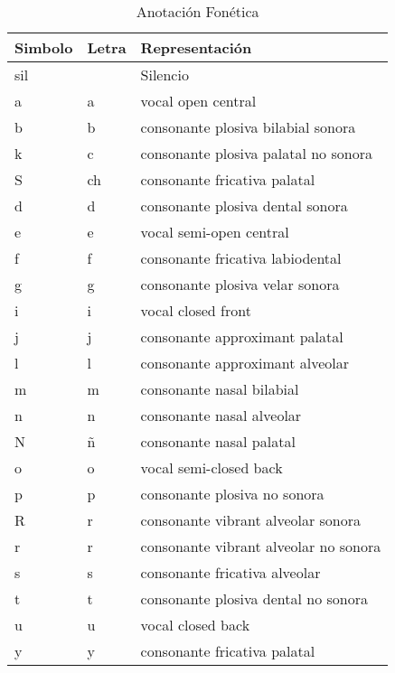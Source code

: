\begin{table}[H]
\centering
\caption{Anotación Fonética}
\label{tab:anotacion_fonetica}
\begin{tabular}{|l|l|l|}
\textbf{Simbolo} & \textbf{Letra} & \textbf{Representación} \\ \hline
sil              & & Silencio                               \\ \hline
a                & a & vocal open central                   \\ \hline
b                & b &  consonante plosiva bilabial sonora   \\ \hline 
k                & c &  consonante plosiva palatal no sonora \\ \hline 
S                & ch &  consonante fricativa palatal        \\ \hline 
d                & d &  consonante plosiva dental sonora     \\ \hline 
e                & e &  vocal semi-open central              \\ \hline
f                & f &  consonante fricativa labiodental     \\ \hline 
g                & g &  consonante plosiva velar sonora      \\ \hline
i                & i &  vocal closed front                   \\ \hline
j                & j &  consonante approximant palatal       \\ \hline
l                & l &  consonante approximant alveolar      \\ \hline 
m                & m &  consonante nasal bilabial            \\ \hline 
n                & n &  consonante nasal alveolar            \\ \hline 
N                & ñ &  consonante nasal palatal             \\ \hline 
o                & o &  vocal semi-closed back               \\ \hline
p                & p &  consonante plosiva no sonora         \\ \hline 
R                & r &  consonante vibrant alveolar sonora   \\ \hline 
r                & r &  consonante vibrant alveolar no sonora \\ \hline
s                & s &  consonante fricativa alveolar         \\ \hline
t                & t &  consonante plosiva dental no sonora   \\ \hline
u                & u &  vocal closed back                    \\ \hline
y                & y &  consonante fricativa palatal         \\ \hline
\end{tabular}
\end{table}